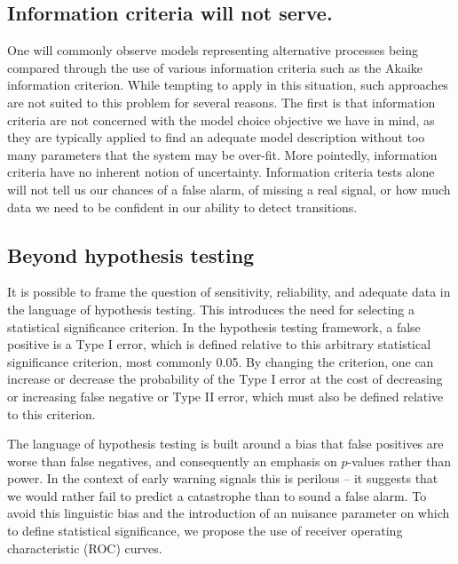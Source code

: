 \documentclass[authoryear,review,11pt]{elsarticle}
\begin{document}
%

\subsection*{Information criteria will not serve.}
One will commonly observe models representing alternative processes being compared through
the use of various information criteria such as the Akaike information criterion.
While tempting to apply in this situation, such approaches are not suited to this problem for several reasons.
The first is that information criteria are not concerned with the model choice objective we have in mind,
as they are typically applied to find an adequate model description without too many parameters that the system may be over-fit.
More pointedly, information criteria have no inherent notion of uncertainty.
Information criteria tests alone will not tell us our chances of a false alarm, of missing a real signal,
or how much data we need to be confident in our ability to detect transitions.

\subsection*{Beyond hypothesis testing}
It is possible to frame the question of sensitivity, reliability, and adequate data in the language of hypothesis testing.
This introduces the need for selecting a statistical significance criterion.
In the hypothesis testing framework, a false positive is a Type I error,
which is defined relative to this arbitrary statistical significance criterion, most commonly 0.05.
By changing the criterion, one can increase or decrease the probability of the Type I error
at the cost of decreasing or increasing false negative or Type II error, which must also be defined relative to this criterion.

The language of hypothesis testing is built around a bias that false positives are worse than false negatives,
and consequently an emphasis on $p$-values rather than power.
In the context of early warning signals this is perilous --
it suggests that we would rather fail to predict a catastrophe than to sound a false alarm.
To avoid this linguistic bias and the introduction of an nuisance parameter on which to define statistical significance,
we propose the use of receiver operating characteristic (ROC) curves.
\end{document}
